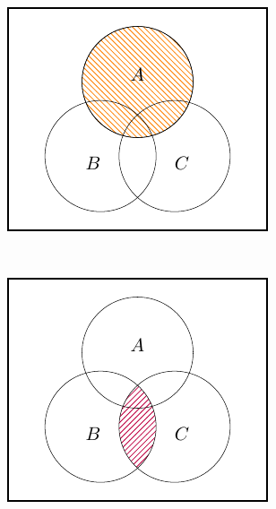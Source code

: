 \documentclass[
  a4paper,
]{book}
\theoremstyle{definition}
\theoremstyle{definition}
\theoremstyle{definition}
\theoremstyle{definition}
\theoremstyle{remark}
\begin{document}
\begin{center}\includegraphics[width=1\linewidth]{math1710_files/figure-latex/dist1-1} \end{center}

~

\begin{center}\includegraphics[width=1\linewidth]{math1710_files/figure-latex/dist2-1} \end{center}

~
\end{document}
